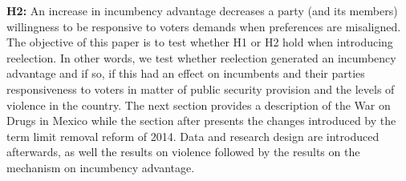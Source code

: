 \documentclass[12pt]{amsart}
\numberwithin{equation}{section}
\theoremstyle{definition}
\theoremstyle{definition}
\theoremstyle{definition}
\begin{document}
\textbf{H2:} An increase in incumbency advantage decreases a party (and its members) willingness to be responsive to voters demands when preferences are misaligned. \\

The objective of this paper is to test whether H1 or H2 hold when introducing reelection. In other words, we test whether reelection generated an incumbency advantage and if so, if this had an effect on incumbents and their parties responsiveness to voters in matter of public security provision and the levels of violence in the country. The next section provides a description of the War on Drugs in Mexico while the section after presents the changes introduced by the term limit removal reform of 2014. Data and research design are introduced afterwards, as well the results on violence followed by the results on the mechanism on incumbency advantage.
\end{document}
